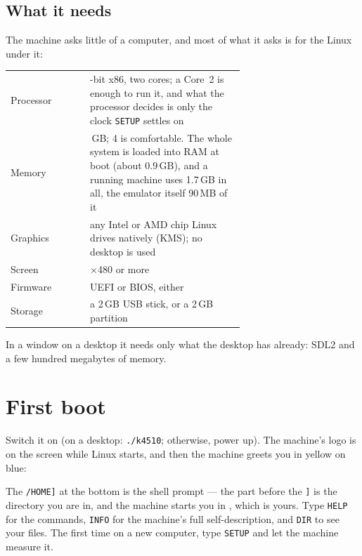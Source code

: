 \subsection*{What it needs}
The machine asks little of a computer, and most of what it asks is for
the Linux under it:
\begin{center}
\small
\begin{tabular}{@{}l >{\raggedright\arraybackslash}p{0.66\linewidth}@{}}
\toprule
Processor & 64-bit x86, two cores; a Core~2 is enough to run it, and what the processor decides is only the clock \verb|SETUP| settles on \\
Memory & 2\,GB; 4 is comfortable. The whole system is loaded into RAM at boot (about 0.9\,GB), and a running machine uses 1.7\,GB in all, the emulator itself 90\,MB of it \\
Graphics & any Intel or AMD chip Linux drives natively (KMS); no desktop is used \\
Screen & 640$\times$480 or more \\
Firmware & UEFI or BIOS, either \\
Storage & a 2\,GB USB stick, or a 2\,GB partition \\
\bottomrule
\end{tabular}
\end{center}
\noindent In a window on a desktop it needs only what the desktop has
already: SDL2 and a few hundred megabytes of memory.

\section{First boot}
Switch it on (on a desktop: \verb|./k4510|; otherwise, power up). The
machine's logo is on the screen while Linux starts, and then the machine
greets you in yellow on blue:


The \verb|/HOME]| at the bottom is the shell prompt --- the part before
the \verb|]| is the directory you are in, and the machine starts you in
, which is yours. Type \verb|HELP| for the commands,
\verb|INFO| for the machine's full self-description, and \verb|DIR| to
see your files. The first time on a new computer, type \verb|SETUP| and
let the machine measure it.

